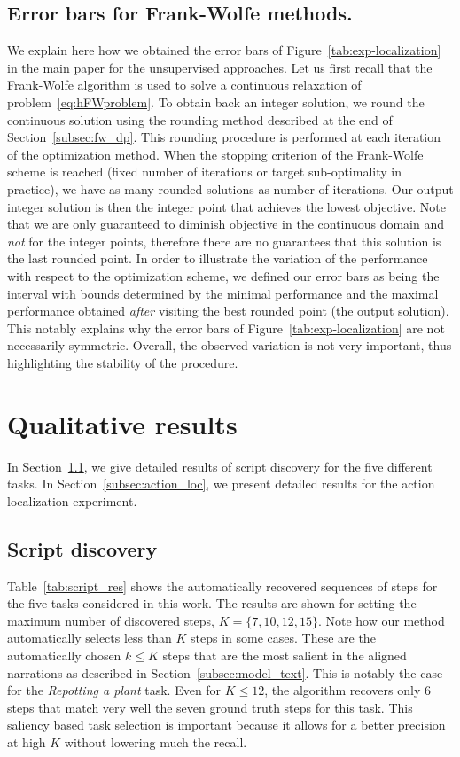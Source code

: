 \documentclass[10pt,twocolumn,letterpaper]{article}
\begin{document}
\subsection{Error bars for Frank-Wolfe methods.}
We explain here how we obtained the error bars of Figure~\ref{tab:exp-localization} in the main paper for the unsupervised approaches.
Let us first recall that the Frank-Wolfe algorithm is used to solve a continuous relaxation of problem~\eqref{eq:hFWproblem}.
To obtain back an integer solution, we round the continuous solution using the rounding method described at the end of Section~\ref{subsec:fw_dp}.
This rounding procedure is performed at each iteration of the optimization method.
When the stopping criterion of the Frank-Wolfe scheme is reached (fixed number of iterations or target sub-optimality in practice), we have as many rounded solutions as number of iterations.
Our output integer solution is then the integer point that achieves the lowest objective.
Note that we are only guaranteed to diminish objective in the continuous domain and \emph{not} for the integer points, therefore there are no guarantees that this solution is the last rounded point.
In order to illustrate the variation of the performance with respect to the optimization scheme, we defined our error bars as being the interval with bounds determined by the minimal performance and the maximal performance obtained \emph{after} visiting the best rounded point (the output solution).
This notably explains why the error bars of Figure~\ref{tab:exp-localization} are not necessarily symmetric.
Overall, the observed variation is not very important, thus highlighting the stability of the procedure.

%
%
%
%
%
%
%
%
%
%
%
%


\section{Qualitative results}
\label{sec:qual_res}

In Section~\ref{subsec:script_disc}, we give detailed results of script discovery for the five different tasks.
In Section~\ref{subsec:action_loc}, we present detailed results for the action localization experiment.

\subsection{Script discovery}
\label{subsec:script_disc}
Table~\ref{tab:script_res} shows the automatically recovered sequences of steps for the five tasks considered in this work. 
%
%
        The results are shown for setting the maximum number of discovered steps, $K = \{7,10,12,15\}$. 
        Note how our method automatically selects less than $K$ steps in some cases.
         These are the automatically chosen $k\leq K$ steps that are the most salient in the aligned narrations as described in Section~\ref{subsec:model_text}.  
		 This is notably the case for the {\em Repotting a plant} task. 
		 Even for $K\leq 12$, the algorithm recovers only 6 steps that match very well the seven ground truth steps for this task. 
		 This saliency based task selection is important because it allows for a better precision at high $K$ without lowering much the recall.       
\end{document}
